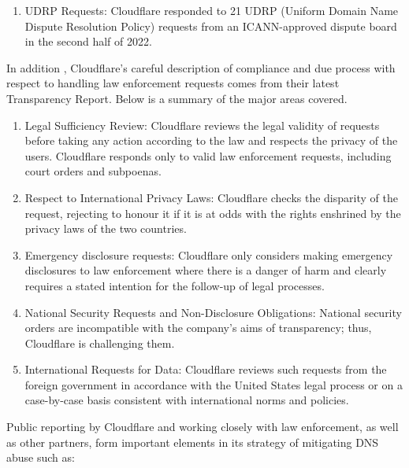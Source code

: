 \begin{enumerate}
\begin{enumerate}
    \item UDRP Requests: Cloudflare responded to 21 UDRP (Uniform Domain Name Dispute Resolution Policy) requests from an ICANN-approved dispute board in the second half of 2022.
    
\end{enumerate}

In addition , Cloudflare's careful description of compliance and due process with respect to handling law enforcement requests comes from their latest Transparency Report. Below is a summary of the major areas covered.

\begin{enumerate}
    \item Legal Sufficiency Review: Cloudflare reviews the legal validity of requests before taking any action according to the law and respects the privacy of the users. Cloudflare responds only to valid law enforcement requests, including court orders and subpoenas.

 \item Respect to International Privacy Laws: Cloudflare checks the disparity of the request, rejecting to honour it if it is at odds with the rights enshrined by the privacy laws of the two countries.

 \item Emergency disclosure requests: Cloudflare only considers making emergency disclosures to law enforcement where there is a danger of harm and clearly requires a stated intention for the follow-up of legal processes.

 \item  National Security Requests and Non-Disclosure Obligations: National security orders are incompatible with the company's aims of transparency; thus, Cloudflare is challenging them.

 \item  International Requests for Data: Cloudflare reviews such requests from the foreign government in accordance with the United States legal process or on a case-by-case basis consistent with international norms and policies.

\end{enumerate}

Public reporting by Cloudflare and working closely with law enforcement, as well as other partners, form important elements in its strategy of mitigating DNS abuse such as: 

\begin{enumerate}


\end{enumerate}
\end{enumerate}
